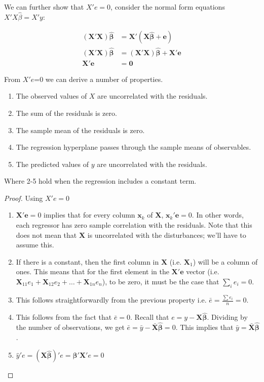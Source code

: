 \documentclass[DIV=14,titlepage=false]{scrreprt}
\begin{document}
We can further show that $X'e=0$, consider the normal form equations $X'X\hat\beta=X'y$:

\begin{align*}
    (\mathbf{X}'\mathbf{X})\hat{\boldsymbol{\beta}} &= \mathbf{X}'(\mathbf{X}\hat{\boldsymbol{\beta}} + \mathbf{e}) \\
    (\mathbf{X}'\mathbf{X})\hat{\boldsymbol{\beta}} &= (\mathbf{X}'\mathbf{X})\hat{\boldsymbol{\beta}} + \mathbf{X}'\mathbf{e} \\
    \mathbf{X}'\mathbf{e} &= \mathbf{0}
\end{align*}
    

\begin{prop}
From $X'e$=0 we can derive a number of properties.
\begin{enumerate}
    \item The observed values of $X$ are uncorrelated with the residuals.
    \item The sum of the residuals is zero.
    \item The sample mean of the residuals is zero.
    \item The regression hyperplane passes through the sample means of observables.
    \item The predicted values of $y$ are uncorrelated with the residuals.
\end{enumerate}
Where 2-5 hold when the regression includes a constant term.
\end{prop}
\begin{proof} Using $X'e=0$
\begin{enumerate}
    \item $\mathbf{X}'\mathbf{e} = 0$ implies that for every column $\mathbf{x}_k$ of $\mathbf{X}$, $\mathbf{x}_k'\mathbf{e} = 0$. In other words, each regressor has zero sample correlation with the residuals. Note that this does not mean that $\mathbf{X}$ is uncorrelated with the disturbances; we'll have to assume this.
    \item  If there is a constant, then the first column in \(\mathbf{X}\) (i.e. \(\mathbf{X}_1\)) will be a column of ones. This means that for the first element in the \(\mathbf{X}'\mathbf{e}\) vector (i.e. \(\mathbf{X}_{11} e_1 + \mathbf{X}_{12} e_2 + \ldots + \mathbf{X}_{1n} e_n\)), to be zero, it must be the case that \(\sum_{i} e_i = 0\).
    \item     This follows straightforwardly from the previous property i.e. \(\bar{e} = \frac{\sum e_i}{n} = 0\).
    \item     This follows from the fact that \(\bar{e} = 0\). Recall that \(e = y - \mathbf{X}\hat{\boldsymbol{\beta}}\). Dividing by the number of observations, we get \(\bar{e} = \bar{y} - \bar{\mathbf{X}}\hat{\boldsymbol{\beta}} = 0\). This implies that \(\bar{y} = \bar{\mathbf{X}}\hat{\boldsymbol{\beta}}\).
    \item     \(\hat{y}'e = (\mathbf{X}\hat{\boldsymbol{\beta}})'e = \hat{\boldsymbol{\beta}}'\mathbf{X}'e = 0\) 
\end{enumerate}
\end{proof}
\end{document}
